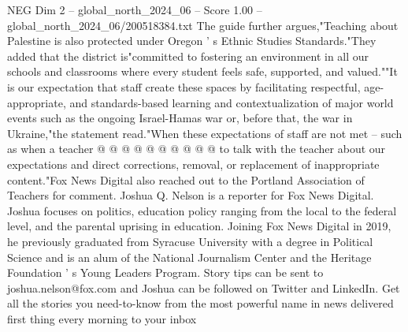 \begin{textsample}{NEG Dim 2 – global\_north\_2024\_06 – Score 1.00 – global\_north\_2024\_06/200518384.txt}
The guide further argues,"Teaching about Palestine is also protected under Oregon ' s Ethnic Studies Standards."They added that the district is"committed to fostering an environment in all our schools and classrooms where every student feels safe, supported, and valued.""It is our expectation that staff create these spaces by facilitating respectful, age-appropriate, and standards-based learning and contextualization of major world events such as the ongoing Israel-Hamas war or, before that, the war in Ukraine,"the statement read."When these expectations of staff are not met -- such as when a teacher @ @ @ @ @ @ @ @ @ @ to talk with the teacher about our expectations and direct corrections, removal, or replacement of inappropriate content."Fox News Digital also reached out to the Portland Association of Teachers for comment.
Joshua Q.
Nelson is a reporter for Fox News Digital.
Joshua focuses on politics, education policy ranging from the local to the federal level, and the parental uprising in education.
Joining Fox News Digital in 2019, he previously graduated from Syracuse University with a degree in Political Science and is an alum of the National Journalism Center and the Heritage Foundation ' s Young Leaders Program.
Story tips can be sent to joshua.nelson@fox.com and Joshua can be followed on Twitter and LinkedIn.
Get all the stories you need-to-know from the most powerful name in news delivered first thing every morning to your inbox

\end{textsample}
